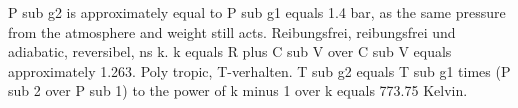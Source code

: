 P sub g2 is approximately equal to P sub g1 equals 1.4 bar, as the same pressure from the atmosphere and weight still acts. Reibungsfrei, reibungsfrei und adiabatic, reversibel, ns k. k equals R plus C sub V over C sub V equals approximately 1.263. Poly tropic, T-verhalten. T sub g2 equals T sub g1 times (P sub 2 over P sub 1) to the power of k minus 1 over k equals 773.75 Kelvin.